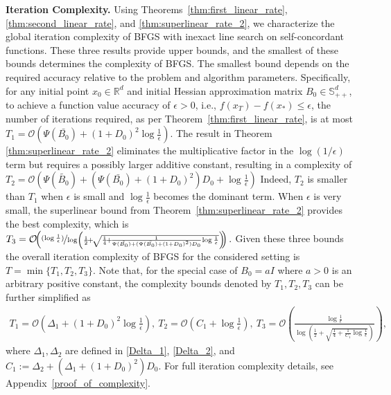 \documentclass[11pt,letterpaper]{article}
\newcommand\0{{\Vector{0}}}
\newcommand\1{{\Vector{1}}}
\numberwithin{assumption}{section}
\numberwithin{definition}{section}
\numberwithin{theorem}{section}
\numberwithin{remark}{section}
\begin{document}
\noindent\textbf{Iteration Complexity.} Using Theorems~\ref{thm:first_linear_rate}, \ref{thm:second_linear_rate}, and \ref{thm:superlinear_rate_2}, we characterize the global iteration complexity of BFGS with inexact line search on self-concordant functions.
 These three results provide upper bounds, and the smallest of these bounds determines the complexity of BFGS. The smallest bound depends on the required accuracy relative to the problem and algorithm parameters. Specifically, for any initial point $x_0 \in \mathbb{R}^d$ and initial Hessian approximation matrix $B_0 \in \mathbb{S}^d_{++}$, to achieve a function value accuracy of $\epsilon > 0$, i.e., $f(x_T) - f(x_*) \leq \epsilon$, the number of iterations required, as per Theorem~\ref{thm:first_linear_rate}, is at most $
    T_1=\mathcal{O}\left(\Psi(\bar{B_0}) + (1 + D_0)^2\log{\frac{1}{\epsilon}}\right) $. 
The result in Theorem \ref{thm:superlinear_rate_2} eliminates the multiplicative factor in the $\log(1/\epsilon)$ term but requires a possibly larger additive constant, resulting in a complexity of $
T_2=\mathcal{O}(\Psi(\tilde{B_0}) + (\Psi(\bar{B_0}) + (1 + D_0)^2)D_0 + \log{\frac{1}{\epsilon}})$
Indeed, $T_2$ is smaller than $T_1$ when $\epsilon$ is small and $\log{\frac{1}{\epsilon}}$ becomes the dominant term. When $\epsilon$ is very small, the superlinear bound from Theorem~\ref{thm:superlinear_rate_2} provides the best complexity, which is
$
T_3=\mathcal{O}\!\!\left(\nicefrac{(\log{\frac{1}{\epsilon}})}{\log\!{\left(\frac{1}{2} \!+\! \sqrt{\frac{1}{4} \!+\! \frac{1}{\Psi(\tilde{B_0}) + (\Psi(\bar{B_0}) + (1 + D_0)^2)D_0}\!\log{\frac{1}{\epsilon}}}\right)}}\! \!\right).
$
Given these three bounds the overall iteration complexity of BFGS for the considered setting is 
$T= \min\{T_1,T_2,T_3\}$.
Note that, for the special case of $B_0 = a I$ where $a > 0$ is an arbitrary positive constant, the complexity bounds denoted by $T_1,T_2,T_3$ can be further simplified as 
\begin{equation*}
\begin{split}
    T_1= \mathcal{O}\!\left( \Delta_1 \!+\! (1 \!+\! D_0)^2\log{\frac{1}{\epsilon}}\right),\ T_2=\mathcal{O}\!\left( C_1 \!+\! \log{\frac{1}{\epsilon}}\right),\  T_3 = \mathcal{O}\!\left( \frac{\log{\frac{1}{\epsilon}}}{\log{\left(\frac{1}{2} \!+\! \sqrt{\frac{1}{4} \!+\! \frac{1}{C_1}\log{\frac{1}{\epsilon}}}\right)}}\right)\!,
\end{split}
\end{equation*}
where $\Delta_1,\Delta_2$ are defined in \eqref{Delta_1}, \eqref{Delta_2}, and $C_1:= \Delta_2 + (\Delta_1 + (1 + D_0)^2)D_0$. For full iteration complexity details, see Appendix~\ref{proof_of_complexity}.
\end{document}
